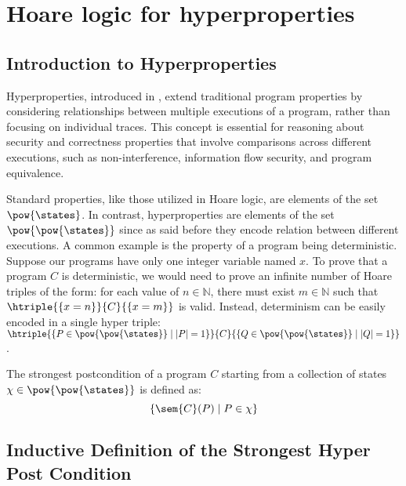 \section{Hoare logic for hyperproperties}

\subsection{Introduction to Hyperproperties}

Hyperproperties, introduced in \cite{Clarkson08}, extend traditional program 
properties by considering relationships between multiple executions of a 
program, rather than focusing on individual traces. This concept is essential 
for reasoning about security and correctness properties that involve comparisons 
across different executions, such as non-interference, information flow security, 
and program equivalence.

Standard properties, like those utilized in Hoare logic, are elements of the set 
$\pow{\states}$. In contrast, hyperproperties are elements of the set 
$\pow{\pow{\states}}$ since as said before they encode relation between different
executions. A common example is the property of a program being deterministic. 
Suppose our programs have only one integer variable named \(x\). 
To prove that a program \(C\) is deterministic, we would need to prove an 
infinite number of Hoare triples of the form: for each value of 
\(n \in \mathbb{N}\), there must exist \(m \in \mathbb{N}\) such that 
$\htriple{\{ x = n \}}{C}{\{ x = m \}}$ is valid. Instead, determinism can be 
easily encoded in a single hyper triple: $\htriple{\{ P \in \pow{\pow{\states}} 
\mid |P| = 1 \}}{C}{\{Q \in \pow{\pow{\states}} \mid |Q| = 1\}}$.

\begin{definition}
  The strongest postcondition of a program \(C\) starting from a collection of 
  states \(\chi \in \pow{\pow{\states}}\) is defined as:
  $$\{ \sem{C}(P) \mid P \in \chi \}$$
\end{definition}


\subsection{Inductive Definition of the Strongest Hyper Post Condition}

